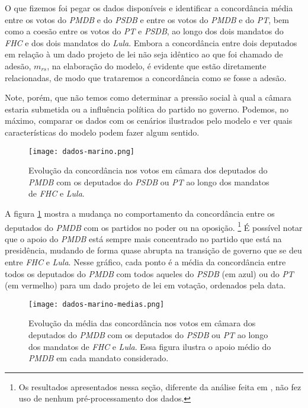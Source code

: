 O que fizemos foi pegar os dados disponíveis e identificar a concordância média entre os votos do \emph{PMDB} e do \emph{PSDB} e entre os votos do \emph{PMDB} e do \emph{PT}, bem como a coesão entre os votos do \emph{PT} e \emph{PSDB}, ao longo dos dois mandatos do \emph{FHC} e dos dois mandatos do \emph{Lula}.
Embora a concordância entre dois deputados em relação à um dado projeto de lei não seja idêntico ao que foi chamado de adesão, $m_{rs}$, na elaboração do modelo, é evidente que estão diretamente relacionadas, de modo que trataremos a concordância como se fosse a adesão.

Note, porém, que não temos como determinar a pressão social à qual a câmara estaria submetida ou a influência política do partido no governo.
Podemos, no máximo, comparar os dados com os cenários ilustrados pelo modelo e ver quais características do modelo podem fazer algum sentido.
\begin{figure}[t!]\label{fig:dados-marino}
    \centering
    \texttt{[image: dados-marino.png]}
    \caption{Evolução da concordância nos votos em câmara dos deputados do \emph{PMDB} com os deputados do \emph{PSDB} ou \emph{PT} ao longo dos mandatos de \emph{FHC} e \emph{Lula}.}
\end{figure}

A figura \ref{fig:dados-marino} mostra a mudança no comportamento da concordância entre os deputados do \emph{PMDB} com os partidos no poder ou na oposição. \footnote{Os resultados apresentados nessa seção, diferente da análise feita em \parencite{MarinoBlog1}, não fez uso de nenhum pré-processamento dos dados.}
É possível notar que o apoio do \emph{PMDB} está sempre mais concentrado no partido que está na presidência, mudando de forma quase abrupta na transição de governo que se deu entre \emph{FHC} e \emph{Lula}.
Nesse gráfico, cada ponto é a média da concordância entre todos os deputados do \emph{PMDB} com todos aqueles do \emph{PSDB} (em azul) ou do \emph{PT} (em vermelho) para um dado projeto de lei em votação, ordenados pela data.
\begin{figure}[t!]\label{fig:dados-marino-medias}
    \centering
    \texttt{[image: dados-marino-medias.png]}
    \caption{Evolução da média das concordância nos votos em câmara dos deputados do \emph{PMDB} com os deputados do \emph{PSDB} ou \emph{PT} ao longo dos mandatos de \emph{FHC} e \emph{Lula}.
Essa figura ilustra o apoio médio do \emph{PMDB} em cada mandato considerado.}
\end{figure}

